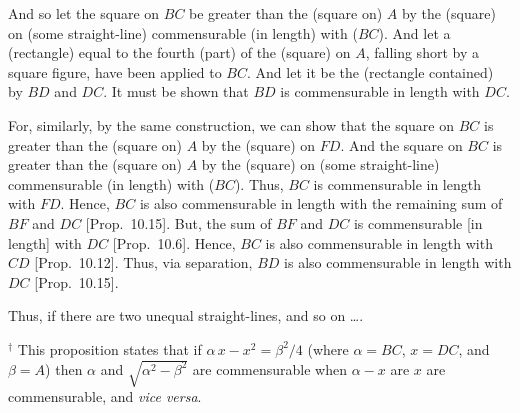 \begin{Parallel}{}{}
{And so let the square on $BC$ be greater than the (square on) $A$ by the
(square) on (some straight-line) commensurable (in length) with ($BC$). And let
a (rectangle) equal to the fourth (part) of the (square) on $A$, falling
short by a square figure, have been applied to $BC$. And let it be
the (rectangle contained) by $BD$ and $DC$. It must be shown that $BD$
is commensurable in length with $DC$.

For, similarly, by the same construction, we can  show that the
square on $BC$ is greater than the (square on) $A$ by the (square) on $FD$.
And the square on $BC$ is greater than the (square on) $A$ by the
(square) on (some straight-line) commensurable (in length) with ($BC$).  Thus, $BC$ is
commensurable in length with $FD$. Hence, $BC$ is also commensurable in length with the remaining sum of $BF$ and $DC$ [Prop.~10.15]. But, the sum of $BF$ and $DC$
is commensurable [in length] with $DC$ [Prop.~10.6]. Hence, $BC$ is also
commensurable in length with $CD$ [Prop.~10.12]. 
Thus, via separation, $BD$ is also commensurable in length with $DC$ [Prop.~10.15].

Thus,  if there are two unequal straight-lines, and so on \ldots.}
\end{Parallel}
{\footnotesize\noindent$^\dag$ This proposition states that if $\alpha\,x-x^2=\beta^2/4$ (where $\alpha=BC$, $x=DC$,
and $\beta=A$) then $\alpha$ and $\sqrt{\alpha^2-\beta^2}$ are commensurable when $\alpha-x$ are $x$ are commensurable, and {\em vice versa}.}

